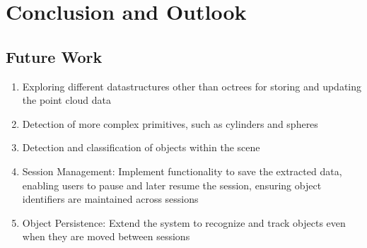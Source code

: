 \chapter{Conclusion and Outlook}

\section{Future Work}
\begin{enumerate}
    \item Exploring different datastructures other than octrees for storing and updating the point cloud data
    \item Detection of more complex primitives, such as cylinders and spheres
    \item Detection and classification of objects within the scene
    \item Session Management: Implement functionality to save the extracted data, enabling users to pause and later resume the session, ensuring object identifiers are maintained across sessions
    \item Object Persistence: Extend the system to recognize and track objects even when they are moved between sessions
\end{enumerate}


